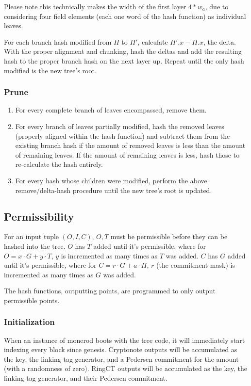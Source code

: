 \documentclass[]{article}
\begin{document}
Please note this technically makes the width of the first layer $4 * w_a$, due to considering four field elements (each one word of the hash function) as individual leaves.

For each branch hash modified from $H$ to $H'$, calculate $H'.x - H.x$, the delta. With the proper alignment and chunking, hash the deltas and add the resulting hash to the proper branch hash on the next layer up. Repeat until the only hash modified is the new tree's root.

\subsubsection{Prune}

\begin{enumerate}
  \item For every complete branch of leaves encompassed, remove them.
  \item For every branch of leaves partially modified, hash the removed leaves (properly aligned within the hash function) and subtract them from the existing branch hash if the amount of removed leaves is less than the amount of remaining leaves. If the amount of remaining leaves is less, hash those to re-calculate the hash entirely.
  \item For every hash whose children were modified, perform the above remove/delta-hash procedure until the new tree's root is updated.
\end{enumerate}

\subsection{Permissibility}

For an input tuple $(O, I, C)$, $O, T$ must be permissible before they can be hashed into the tree. $O$ has $T$ added until it's permissible, where for $O = x \cdot G + y \cdot T$, $y$ is incremented as many times as $T$ was added. $C$ has $G$ added until it's permissible, where for $C = r \cdot G + a \cdot H$, $r$ (the commitment mask) is incremented as many times as $G$ was added.

The hash functions, outputting points, are programmed to only output permissible points.

\subsubsection{Initialization}

When an instance of monerod boots with the tree code, it will immediately start indexing every block since genesis. Cryptonote outputs will be accumulated as the key, the linking tag generator, and a Pedersen commitment for the amount (with a randomness of zero). RingCT outputs will be accumulated as the key, the linking tag generator, and their Pedersen commitment.
\end{document}
